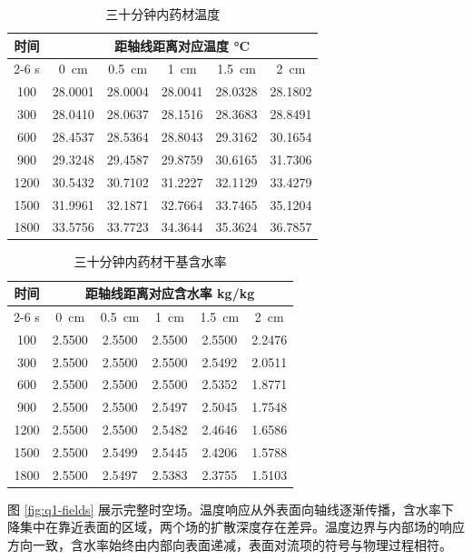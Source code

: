\documentclass[withoutpreface,bwprint]{cumcmthesis}
\begin{document}
\begin{table}[htbp]
\centering
\caption{三十分钟内药材温度}
\label{tab:q1-temperature}
\small
\begin{tabular}{cccccc}
\toprule
时间 & \multicolumn{5}{c}{距轴线距离对应温度 \si{\degreeCelsius}} \\
\cmidrule(lr){2-6}
\si{s} & \SI{0}{cm} & \SI{0.5}{cm} & \SI{1}{cm} & \SI{1.5}{cm} & \SI{2}{cm} \\
\midrule
100  & 28.0001 & 28.0004 & 28.0041 & 28.0328 & 28.1802 \\
300  & 28.0410 & 28.0637 & 28.1516 & 28.3683 & 28.8491 \\
600  & 28.4537 & 28.5364 & 28.8043 & 29.3162 & 30.1654 \\
900  & 29.3248 & 29.4587 & 29.8759 & 30.6165 & 31.7306 \\
1200 & 30.5432 & 30.7102 & 31.2227 & 32.1129 & 33.4279 \\
1500 & 31.9961 & 32.1871 & 32.7664 & 33.7465 & 35.1204 \\
1800 & 33.5756 & 33.7723 & 34.3644 & 35.3624 & 36.7857 \\
\bottomrule
\end{tabular}
\end{table}

\begin{table}[htbp]
\centering
\caption{三十分钟内药材干基含水率}
\label{tab:q1-moisture}
\small
\begin{tabular}{cccccc}
\toprule
时间 & \multicolumn{5}{c}{距轴线距离对应含水率 \si{kg/kg}} \\
\cmidrule(lr){2-6}
\si{s} & \SI{0}{cm} & \SI{0.5}{cm} & \SI{1}{cm} & \SI{1.5}{cm} & \SI{2}{cm} \\
\midrule
100  & 2.5500 & 2.5500 & 2.5500 & 2.5500 & 2.2476 \\
300  & 2.5500 & 2.5500 & 2.5500 & 2.5492 & 2.0511 \\
600  & 2.5500 & 2.5500 & 2.5500 & 2.5352 & 1.8771 \\
900  & 2.5500 & 2.5500 & 2.5497 & 2.5045 & 1.7548 \\
1200 & 2.5500 & 2.5500 & 2.5482 & 2.4646 & 1.6586 \\
1500 & 2.5500 & 2.5499 & 2.5445 & 2.4206 & 1.5788 \\
1800 & 2.5500 & 2.5497 & 2.5383 & 2.3755 & 1.5103 \\
\bottomrule
\end{tabular}
\end{table}

图 \ref{fig:q1-fields} 展示完整时空场。温度响应从外表面向轴线逐渐传播，含水率下降集中在靠近表面的区域，两个场的扩散深度存在差异。温度边界与内部场的响应方向一致，含水率始终由内部向表面递减，表面对流项的符号与物理过程相符。
\end{document}
